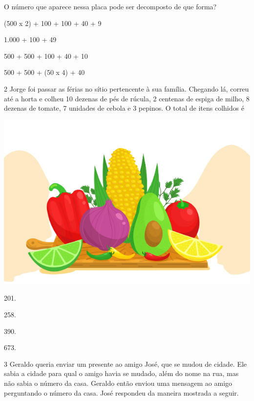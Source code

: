 
O número que aparece nessa placa pode ser decomposto de que forma?

\begin{escolha}
\item (500 x 2) + 100 + 100 + 40 + 9
\item 1.000 + 100 + 49  
\item 500 + 500 + 100 + 40 + 10  
\item 500 + 500 + (50 x 4) + 40  
\end{escolha}

\pagebreak
\num{2} Jorge foi passar as férias no sítio pertencente à sua família. Chegando lá,
correu até a horta e colheu 
10 dezenas de pés de rúcula, 
2 centenas de espiga de milho, 
8 dezenas de tomate,
7 unidades de cebola e 
3 pepinos.
O total de itens colhidos é

\begin{center}
\includegraphics[width=\textwidth]{media/image86b.png}
\end{center}

\begin{escolha}
\item
  201.
\item
  258.
\item
  390.
\item
  673.
\end{escolha}


\num{3} Geraldo queria enviar um presente ao amigo José, que se mudou de cidade. Ele
sabia a cidade para qual o amigo havia se mudado, além do nome na rua, mas
não sabia o número da casa. Geraldo então enviou uma mensagem ao
amigo perguntando o número da casa. José respondeu da maneira mostrada a seguir.

